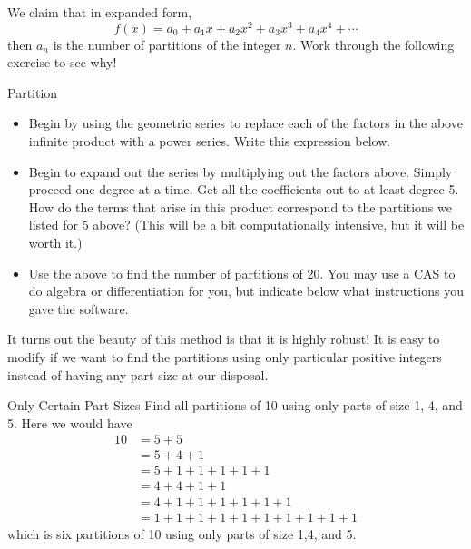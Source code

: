 We claim that in expanded form,  $$ f(x)=a_0+a_1x+a_2x^2+a_3x^3+a_4x^4+\cdots$$
then $a_n$ is the number of partitions of the integer $n$.  Work through the following exercise to see why!
\begin{exercise}{Partition  \Coffeecup \Coffeecup}

\begin{itemize}

\item Begin by using the geometric series to replace each of the factors in the above infinite product with a power series.  Write this expression below.

\vspace*{2in}

\item Begin to expand out the series by multiplying out the factors above.  Simply proceed one degree at a time.  Get all the coefficients out to at least degree 5.  How do the terms that arise in this product correspond to the partitions we listed for 5 above?  (This will be a bit computationally intensive, but it will be worth it.)

\vspace*{4in}

\item Use the above to find the number of partitions of 20.  You may use a CAS to do algebra or differentiation for you, but indicate below what instructions you gave the software.

\vspace*{1in}
\end{itemize}
\end{exercise}

\newpage

It turns out the beauty of this method is that it is highly robust!  It is easy to modify if we want to find the partitions using only particular positive integers instead of having any part size at our disposal.  

\begin{example}{Only Certain Part Sizes}
Find all partitions of 10 using only parts of size 1, 4, and 5.  Here we would have 
\begin{align*}
10&=5+5 \\ 
&=5+4+1 \\ 
&=5+1+1+1+1+1 \\
&=4+4+1+1 \\ 
&=4+1+1+1+1+1+1 \\ 
&=1+1+1+1+1+1+1+1+1+1
\end{align*}
which is six partitions of 10 using only parts of size 1,4, and 5.
\end{example}


